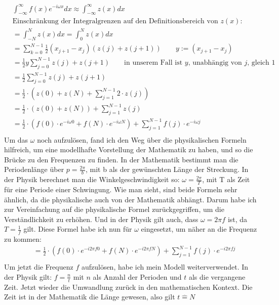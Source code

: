 \documentclass[a4paper,12pt]{article}
\theoremstyle{definition}
\theoremstyle{remark}
\begin{document}
\begin{align*}
& \int_{-\infty}^\infty{f(x)e^{-i\omega x} dx} \approx \int_{-\infty}^\infty{z(x) dx}\\ 
&\text{Einschränkung der Integralgrenzen auf den Definitionsbereich von $z(x)$: }\\
& =\int_{-N}^{N}{z(x)dx} = \int_{0}^{N}{z(x)dx} \\
&= \sum_{k = 0}^{N-1}{\frac{1}{2}(x_{j+1}-x_j)(z(j) + z(j+1))} \qquad y:= (x_{j+1}-x_j)\\
& =\frac{1}{2} y \sum_{j=0}^{N-1} z(j)+z(j+1) \qquad \text{in unserem Fall ist $y$, unabhängig von $j$, gleich $1$} \\
& =\frac{1}{2} \sum_{j=0}^{N-1} z(j)+z(j+1) \\
& =\frac{1}{2} \cdot\left(z(0)+z(N)+\sum_{j=1}^{N-1} 2 \cdot z(j)\right) \\
& =\frac{1}{2} \cdot(z(0)+z(N))+\sum_{j=1}^{N-1} z(j) \\
& =\frac{1}{2} \cdot\left(f(0) \cdot e^{-i \omega 0}+f(N) \cdot e^{-i \omega N}\right)+\sum_{j=1}^{N-1} f(j) \cdot e^{-i \omega j} \\
\end{align*}
Um das $\omega$ noch aufzulösen, fand ich den Weg über die physikalischen Formeln hilfreich, um eine 
modellhafte Vorstellung der Mathematik zu haben, und so die Brücke zu den Frequenzen zu finden. In der Mathematik 
bestimmt man die Periodenlänge über $p = \frac{2\pi}{b}$, mit b als der gewünschten Länge der Streckung. In der Physik 
berechnet man die Winkelgeschwindigkeit so: $\omega = \frac{2\pi}{T}$, mit T als Zeit für eine Periode einer Schwingung. 
Wie man sieht, sind beide Formeln sehr ähnlich, da die physikalische auch von der Mathematik abhängt. Darum habe ich zur Vereinfachung 
auf die physikalische Formel zurückgegriffen, um die Verständlichkeit zu erhöhen. Und in der Physik 
gilt auch, dass $\omega = 2\pi f$ ist, da $T = \frac{1}{f}$ gilt. Diese Formel habe ich nun für $\omega$ eingesetzt, 
um näher an die Frequenz zu kommen:
\begin{align*}
& =\frac{1}{2} \cdot\left(f(0) \cdot e^{-i 2 \pi f 0}+f(N) \cdot e^{-i 2 \pi f N}\right)+\sum_{j=1}^{N-1} f(j) \cdot e^{-i 2 \pi f j} \\
\end{align*}
Um jetzt die Frequenz $f$ aufzulösen, habe ich mein Modell weiterverwendet. In der Physik gilt: 
$f = \frac{n}{t}$ mit $n$ als Anzahl der Perioden und $t$ als die vergangene Zeit. Jetzt wieder die Umwandlung 
zurück in den mathematischen Kontext. Die Zeit ist in der Mathematik die Länge gewesen, also gilt $t \widehat{=} N$
\end{document}
